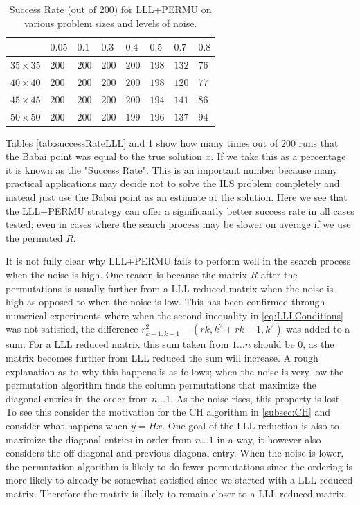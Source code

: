 \documentclass[12pt,Bold,letterpaper]{mcgilletdclass}
\begin{document}
\begin{table} \label{tab:successRatePermu}
\caption{Success Rate (out of 200) for LLL+PERMU on various problem sizes and levels of noise.}
\begin{tabular}{|l|l|l|l|l|l|l|l|} 
\hline
 &              $0.05$ & $0.1$ & $0.3$ & $0.4$ & $0.5$ & $0.7$ & $0.8$ \\ \hline
$35 \times 35$& $200$  & $200$ & $200$ & $200$ & $198$ & $132$  & $76$\\ \hline
$40 \times 40$& $200$  & $200$ & $200$ & $200$ & $198$ & $120$  & $77$\\ \hline
$45 \times 45$& $200$  & $200$ & $200$ & $200$ & $194$ & $141$  & $86$\\ \hline
$50 \times 50$& $200$  & $200$ & $200$ & $199$ & $196$ & $137$  & $94$\\
\hline
\end{tabular}
\end{table}

Tables \ref{tab:successRateLLL} and \ref{tab:successRatePermu} show how many times out of $200$ runs that the Babai point was equal to the true solution $x$. If we take this as a percentage it is known as the "Success Rate". This is an important number because many practical applications may decide not to solve the ILS problem completely and instead just use the Babai point as an estimate at the solution. Here we see that the LLL+PERMU strategy can offer a significantly better success rate in all cases tested; even in cases where the search process may be slower on average if we use the permuted $R$.

It is not fully clear why LLL+PERMU fails to perform well in the search process when the noise is high. One reason is because the matrix $R$ after the permutations is usually further from a LLL reduced matrix when the noise is high as opposed to when the noise is low. This has been confirmed through numerical experiments where when the second inequality in \ref{eq:LLLConditions} was not satisfied, the difference $r_{k-1,k-1}^2 - (r{k,k}^2 + r{k-1,k}^2)$ was added to a sum. For a LLL reduced matrix this sum taken from $1 \dots n$ should be $0$, as the matrix becomes further from LLL reduced the sum will increase. A rough explanation as to why this happens is as follows; when the noise is very low the permutation algorithm finds the column permutations that maximize the diagonal entries in the order from $n \dots 1$. As the noise rises, this property is lost. To see this consider the motivation for the CH algorithm in \ref{subsec:CH} and consider what happens when $y = Hx$. One goal of the LLL reduction is also to maximize the diagonal entries in order from $n \dots 1$ in a way, it however also considers the off diagonal and previous diagonal entry. When the noise is lower, the permutation algorithm is likely to do fewer permutations since the ordering is more likely to already be somewhat satisfied since we started with a LLL reduced matrix. Therefore the matrix is likely to remain closer to a LLL reduced matrix.
\end{document}
